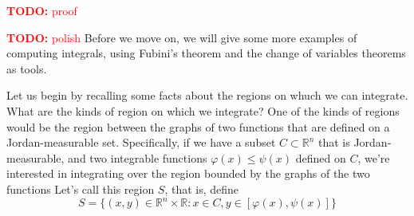 \documentclass{article}
\newcommand{\reals}[0]{\mathbb{R}}
\newcommand{\TODO}[1]{\textcolor{red}{\textbf{TODO:} #1}}
\begin{document}
\begin{enumerate}
\end{enumerate}

\TODO{proof}

\TODO{polish}
Before we move on, we will give some more examples of computing integrals, using Fubini's theorem and the change of variables theorems as tools.

Let us begin by recalling some facts about the regions on whuch we can integrate. What are the kinds of region on which we integrate? One of the kinds of regions would be the region between the graphs of two functions that are defined on a Jordan-measurable set. Specifically, if we have a subset \(C \subset \reals^n\) that is Jordan-measurable, and two integrable functions \(\varphi(x) \leq \psi(x)\) defined on \(C\), we're interested in integrating over the region bounded by the graphs of the two functions Let's call this region \(S\), that is, define
\begin{equation}
  S = \{(x, y) \in \reals^n \times \reals : x \in C, y \in [\varphi(x), \psi(x)]\}
\end{equation}
\end{document}
